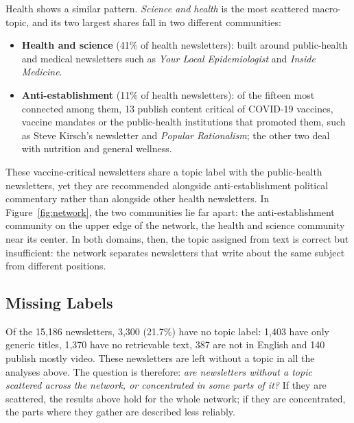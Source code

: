 \documentclass[sigchi]{acmart}
\begin{document}
Health shows a similar pattern. \emph{Science and health} is the most
scattered macro-topic, and its two largest shares fall in two different communities:
\begin{itemize}
  \item \textbf{Health and science} (41\% of health newsletters): built
  around public-health and medical newsletters such as \emph{Your Local
  Epidemiologist} and \emph{Inside Medicine}.
  \item \textbf{Anti-establishment} (11\% of health newsletters): of the
  fifteen most connected among them, 13 publish content critical of
  COVID-19 vaccines, vaccine mandates or the public-health institutions
  that promoted them, such as Steve Kirsch's newsletter and
  \emph{Popular Rationalism}; the other two deal with nutrition and
  general wellness.
\end{itemize}
These vaccine-critical newsletters share a topic label with the
public-health newsletters, yet they are recommended alongside
anti-\hspace{0pt}establishment political commentary rather than
alongside other health newsletters. In
Figure~\ref{fig:network}, the two communities lie far apart: the
anti-establishment community on the upper edge of the network, the
health and science community near its center.
In both domains, then, the topic assigned from text is correct but
insufficient: the network separates newsletters that write about the
same subject from different positions.


\subsection{Missing Labels}
\label{sec:missing}

Of the 15{,}186 newsletters, 3{,}300 (21.7\%) have no topic label:
1{,}403 have only generic titles, 1{,}370 have no retrievable text, 387 are not in English and 140 publish mostly video. These newsletters are left without a topic in all the analyses above. The question is therefore: \emph{are newsletters without a topic scattered across the network, or concentrated in some parts of it?} If they are scattered, the results above hold for the whole network; if they are concentrated, the parts where they gather are described less reliably.
\end{document}
